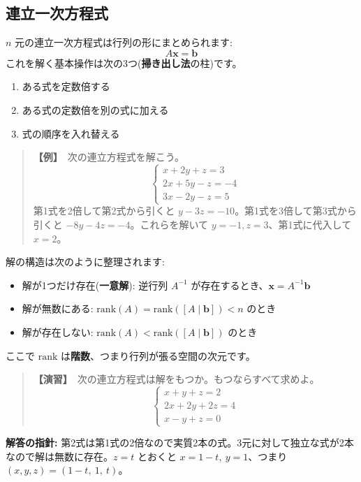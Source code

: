 \documentclass{article}
\begin{document}
\subsection{連立一次方程式}

\(n\) 元の連立一次方程式は行列の形にまとめられます:
\[ A\boldsymbol{x} = \boldsymbol{b} \]
これを解く基本操作は次の3つ(\textbf{掃き出し法}の柱)です。
\begin{enumerate}
\item ある式を定数倍する
\item ある式の定数倍を別の式に加える
\item 式の順序を入れ替える
\end{enumerate}

\begin{quote}
\textbf{【例】}\ 次の連立方程式を解こう。
\[ \begin{cases} x + 2y + z = 3 \\ 2x + 5y - z = -4 \\ 3x - 2y - z = 5 \end{cases} \]
第1式を2倍して第2式から引くと \(y - 3z = -10\)。第1式を3倍して第3式から引くと \(-8y - 4z = -4\)。これらを解いて \(y = -1, z = 3\)、第1式に代入して \(x = 2\)。
\end{quote}

解の構造は次のように整理されます:
\begin{itemize}
\item 解が1つだけ存在(\textbf{一意解}): 逆行列 \(A^{-1}\) が存在するとき、\(\boldsymbol{x} = A^{-1}\boldsymbol{b}\)
\item 解が無数にある: \(\mathrm{rank}(A) = \mathrm{rank}([A \mid \boldsymbol{b}]) < n\) のとき
\item 解が存在しない: \(\mathrm{rank}(A) < \mathrm{rank}([A \mid \boldsymbol{b}])\) のとき
\end{itemize}

ここで \(\mathrm{rank}\) は\textbf{階数}、つまり行列が張る空間の次元です。

\begin{quote}
\textbf{【演習】}\ 次の連立方程式は解をもつか。もつならすべて求めよ。
\[ \begin{cases} x + y + z = 2 \\ 2x + 2y + 2z = 4 \\ x - y + z = 0 \end{cases} \]
\end{quote}

\textbf{解答の指針:} 第2式は第1式の2倍なので実質2本の式。3元に対して独立な式が2本なので解は無数に存在。\(z = t\) とおくと \(x = 1 - t,\ y = 1\)、つまり \((x, y, z) = (1 - t,\ 1,\ t)\)。
\end{document}
